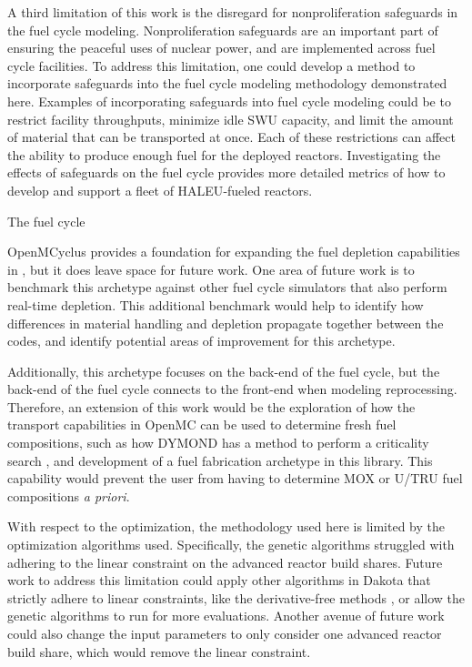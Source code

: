 A third limitation of this work is the disregard for nonproliferation 
safeguards in the fuel cycle modeling. Nonproliferation safeguards 
are an important part of ensuring the peaceful uses of nuclear 
power, and are implemented across fuel cycle facilities. To 
address this limitation, one could develop 
a method to incorporate safeguards into the fuel cycle modeling
methodology demonstrated here. 
Examples of incorporating safeguards into fuel cycle modeling could 
be to restrict facility throughputs, minimize idle \gls{SWU} 
capacity, and limit the amount of material that can be transported 
at once. Each of these restrictions can affect the ability 
to produce enough fuel for the deployed reactors. Investigating 
the effects of safeguards on the fuel cycle provides more 
detailed metrics of how to develop and support a fleet of 
\gls{HALEU}-fueled reactors. 

The fuel cycle 

OpenMCyclus provides a foundation for expanding the fuel depletion 
capabilities in \Cyclus, but it does leave space for future work. 
One area of future work is to benchmark this archetype against 
other fuel cycle simulators that also perform real-time 
depletion. This additional benchmark would help to identify 
how differences in material handling and depletion 
propagate together between the codes, and identify potential 
areas of improvement for this archetype. 

Additionally, this archetype focuses on the back-end of 
the fuel cycle, but the back-end of the fuel cycle connects 
to the front-end when modeling reprocessing. Therefore, an 
extension of this work would be the
exploration of how the transport capabilities in OpenMC can 
be used to determine fresh fuel compositions, such as 
how \gls{DYMOND} has a method to perform a criticality search 
\cite{richards_application_2021}, 
and development of a fuel fabrication archetype in this library. 
This capability would prevent the user from having to determine 
\gls{MOX} or U/TRU fuel compositions \textit{a priori}.  



With respect to the optimization, the methodology used here is 
limited by the optimization algorithms used. Specifically, the 
genetic algorithms struggled with adhering to the linear constraint 
on the advanced reactor build shares. Future work to address this 
limitation could apply other algorithms in Dakota that strictly 
adhere to linear constraints, like the derivative-free methods 
\cite{adams_dakota_2021}, or allow the genetic algorithms to 
run for more evaluations. Another avenue of future work could 
also change the input parameters to only consider one advanced 
reactor build share, which would remove the linear constraint. 

